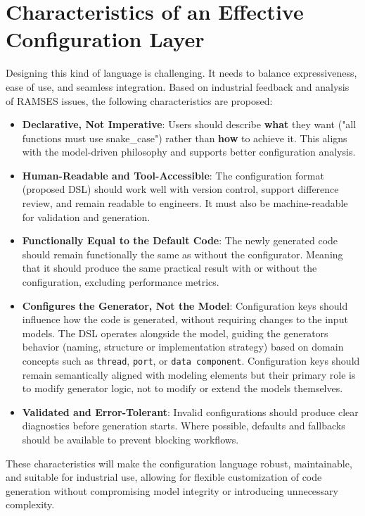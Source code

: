 \section{Characteristics of an Effective Configuration Layer}
\label{sec:config_language_characteristics}

Designing this kind of language is challenging. It needs to balance expressiveness, ease of use, and seamless integration. Based on industrial feedback and analysis of RAMSES issues, the following characteristics are proposed:

\begin{itemize}
	\item \textbf{Declarative, Not Imperative}: Users should describe \textbf{what} they want ("all functions must use snake\_case") rather than \textbf{how} to achieve it. This aligns with the model-driven philosophy and supports better configuration analysis.
	\item \textbf{Human-Readable and Tool-Accessible}: The configuration format (proposed \gls{DSL}) should work well with version control, support difference review, and remain readable to engineers. It must also be machine-readable for validation and generation.
	\item \textbf{Functionally Equal to the Default Code}: The newly generated code should remain functionally the same as without the configurator. Meaning that it should produce the same practical result with or without the configuration, excluding performance metrics.
	\item \textbf{Configures the Generator, Not the Model}: Configuration keys should influence how the code is generated, without requiring changes to the input models. The DSL operates alongside the model, guiding the generators behavior (naming, structure or implementation strategy) based on domain concepts such as \texttt{thread}, \texttt{port}, or \texttt{data component}. Configuration keys should remain semantically aligned with modeling elements but their primary role is to modify generator logic, not to modify or extend the models themselves.
	\item \textbf{Validated and Error-Tolerant}: Invalid configurations should produce clear diagnostics before generation starts. Where possible, defaults and fallbacks should be available to prevent blocking workflows.
\end{itemize}

These characteristics will make the configuration language robust, maintainable, and suitable for industrial use, allowing for flexible customization of code generation without compromising model integrity or introducing unnecessary complexity.

